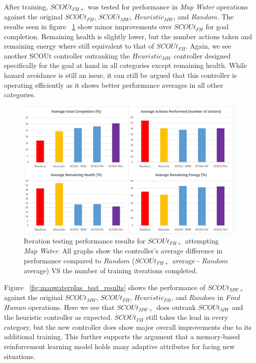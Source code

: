 After training, $SCOUt_{FH+}$ was tested for performance in \textit{Map Water} operations against the original $SCOUt_{FH}$, $SCOUt_{MW}$, $Heuristic_{MW}$, and $Random$.
The results seen in figure ~\ref{fig:findhumanplus_test_results} show minor improvements over $SCOUt_{FH}$ for goal completion.
Remaining health is slightly lower, but the number actions taken and remaining energy where still equivalent to that of $SCOUt_{FH}$.
Again, we see another SCOUt controller outranking the $Heuristic_{MW}$ controller designed specifically for the goal at hand in all categories except remaining health.
While hazard avoidance is still an issue, it can still be argued that this controller is operating efficiently as it shows better performance averages in all other categories.

\begin{figure}[H]
  \includegraphics[width=1.0\columnwidth]{Figures/Results/Experiment2/AdditionalTraining/FindHumanPlus.JPG}
  \caption{Iteration testing performance results for $SCOUt_{FH+}$ attempting \textit{Map Water}. All graphs show the controller's average difference in performance compared to $Random$ ($SCOUt_{FH+}$ average - $Random$ average) VS the number of training iterations completed.}
  \label{fig:findhumanplus_test_results}
\end{figure}


Figure ~\ref{fig:mapwaterplus_test_results} shows the performance of $SCOUt_{MW+}$ against the original $SCOUt_{MW}$, $SCOUt_{FH}$, $Heuristic_{FH}$, and $Random$ in \textit{Find Human} operations.
Here we see that $SCOUt_{MW+}$ does outrank $SCOUt_{MW}$ and the heuristic controller as expected.
$SCOUt_{FH}$ still takes the lead in every category, but the new controller does show major overall improvements due to its additional training.
This further supports the argument that a memory-based reinforcement learning model holds many adaptive attributes for facing new situations.


